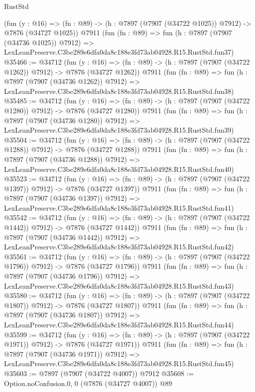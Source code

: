 \begin{lexlean}{RustStd}
\begin{coremodule}
    (fun (y : @16) =>
    (fn : @89) -> (h : @7897 (@7907 (@34722 @1025)) @7912) -> @7876 (@34727 @1025))
    @7911
    (fun (fn : @89) =>
    fun (h : @7897 (@7907 (@34736 @1025)) @7912) =>
    LexLeanPreserve.C3be289e6dfa0da8c188e3fd73ab04928.R15.RustStd.fun37)
@35466 := @34712
    (fun (y : @16) =>
    (fn : @89) -> (h : @7897 (@7907 (@34722 @1262)) @7912) -> @7876 (@34727 @1262))
    @7911
    (fun (fn : @89) =>
    fun (h : @7897 (@7907 (@34736 @1262)) @7912) =>
    LexLeanPreserve.C3be289e6dfa0da8c188e3fd73ab04928.R15.RustStd.fun38)
@35485 := @34712
    (fun (y : @16) =>
    (fn : @89) -> (h : @7897 (@7907 (@34722 @1280)) @7912) -> @7876 (@34727 @1280))
    @7911
    (fun (fn : @89) =>
    fun (h : @7897 (@7907 (@34736 @1280)) @7912) =>
    LexLeanPreserve.C3be289e6dfa0da8c188e3fd73ab04928.R15.RustStd.fun39)
@35504 := @34712
    (fun (y : @16) =>
    (fn : @89) -> (h : @7897 (@7907 (@34722 @1288)) @7912) -> @7876 (@34727 @1288))
    @7911
    (fun (fn : @89) =>
    fun (h : @7897 (@7907 (@34736 @1288)) @7912) =>
    LexLeanPreserve.C3be289e6dfa0da8c188e3fd73ab04928.R15.RustStd.fun40)
@35523 := @34712
    (fun (y : @16) =>
    (fn : @89) -> (h : @7897 (@7907 (@34722 @1397)) @7912) -> @7876 (@34727 @1397))
    @7911
    (fun (fn : @89) =>
    fun (h : @7897 (@7907 (@34736 @1397)) @7912) =>
    LexLeanPreserve.C3be289e6dfa0da8c188e3fd73ab04928.R15.RustStd.fun41)
@35542 := @34712
    (fun (y : @16) =>
    (fn : @89) -> (h : @7897 (@7907 (@34722 @1442)) @7912) -> @7876 (@34727 @1442))
    @7911
    (fun (fn : @89) =>
    fun (h : @7897 (@7907 (@34736 @1442)) @7912) =>
    LexLeanPreserve.C3be289e6dfa0da8c188e3fd73ab04928.R15.RustStd.fun42)
@35561 := @34712
    (fun (y : @16) =>
    (fn : @89) -> (h : @7897 (@7907 (@34722 @1796)) @7912) -> @7876 (@34727 @1796))
    @7911
    (fun (fn : @89) =>
    fun (h : @7897 (@7907 (@34736 @1796)) @7912) =>
    LexLeanPreserve.C3be289e6dfa0da8c188e3fd73ab04928.R15.RustStd.fun43)
@35580 := @34712
    (fun (y : @16) =>
    (fn : @89) -> (h : @7897 (@7907 (@34722 @1807)) @7912) -> @7876 (@34727 @1807))
    @7911
    (fun (fn : @89) =>
    fun (h : @7897 (@7907 (@34736 @1807)) @7912) =>
    LexLeanPreserve.C3be289e6dfa0da8c188e3fd73ab04928.R15.RustStd.fun44)
@35599 := @34712
    (fun (y : @16) =>
    (fn : @89) -> (h : @7897 (@7907 (@34722 @1971)) @7912) -> @7876 (@34727 @1971))
    @7911
    (fun (fn : @89) =>
    fun (h : @7897 (@7907 (@34736 @1971)) @7912) =>
    LexLeanPreserve.C3be289e6dfa0da8c188e3fd73ab04928.R15.RustStd.fun45)
@35603 := @7897 (@7907 (@34722 @4007)) @7912
@35608 := Option.noConfusion.{0, 0} (@7876 (@34727 @4007)) @89

\end{coremodule}
\end{lexlean}
